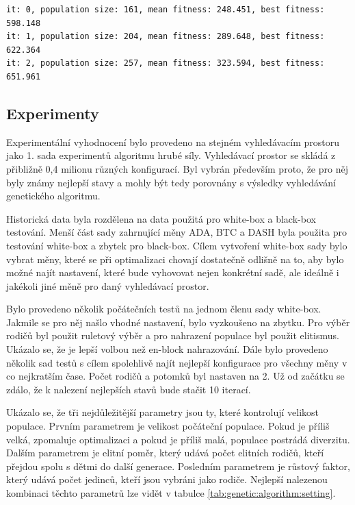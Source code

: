\begin{lstlisting}[caption={~Rozšíření logu pro genetický algoritmus},label={lst:genetic:algorithm:log},captionpos=t,abovecaptionskip=-\medskipamount,belowcaptionskip=\medskipamount]
it: 0, population size: 161, mean fitness: 248.451, best fitness: 598.148
it: 1, population size: 204, mean fitness: 289.648, best fitness: 622.364
it: 2, population size: 257, mean fitness: 323.594, best fitness: 651.961
\end{lstlisting}

\subsection{Experimenty}
Experimentální vyhodnocení bylo provedeno na stejném vyhledávacím prostoru jako 1. sada experimentů algoritmu hrubé síly.
Vyhledávací prostor se skládá z přibližně 0,4 milionu různých konfigurací.
Byl vybrán především proto, že pro něj byly známy nejlepší stavy a mohly být tedy porovnány s výsledky vyhledávání genetického algoritmu.

Historická data byla rozdělena na data použitá pro white-box a black-box testování.
Menší část sady zahrnující měny ADA, BTC a DASH byla použita pro testování white-box a zbytek pro black-box.
Cílem vytvoření white-box sady bylo vybrat měny, které se při optimalizaci chovají dostatečně odlišně na to, aby bylo možné najít nastavení, které bude vyhovovat nejen konkrétní sadě, ale ideálně i jakékoli jiné měně pro daný vyhledávací prostor.

Bylo provedeno několik počátečních testů na jednom členu sady white-box.
Jakmile se pro něj našlo vhodné nastavení, bylo vyzkoušeno na zbytku.
Pro výběr rodičů byl použit ruletový výběr a pro nahrazení populace byl použit elitismus.
Ukázalo se, že je lepší volbou než en-block nahrazování.
Dále bylo provedeno několik sad testů s cílem spolehlivě najít nejlepší konfigurace pro všechny měny v co nejkratším čase.
Počet rodičů a potomků byl nastaven na 2.
Už od začátku se zdálo, že k nalezení nejlepších stavů bude stačit 10 iterací.

Ukázalo se, že tři nejdůležitější parametry jsou ty, které kontrolují velikost populace.
Prvním parametrem je velikost počáteční populace.
Pokud je příliš velká, zpomaluje optimalizaci a pokud je příliš malá, populace postrádá diverzitu.
Dalším parametrem je elitní poměr, který udává počet elitních rodičů, kteří přejdou spolu s dětmi do další generace.
Posledním parametrem je růstový faktor, který udává počet jedinců, kteří jsou vybráni jako rodiče.
Nejlepší nalezenou kombinaci těchto parametrů lze vidět v tabulce \ref{tab:genetic:algorithm:setting}.

